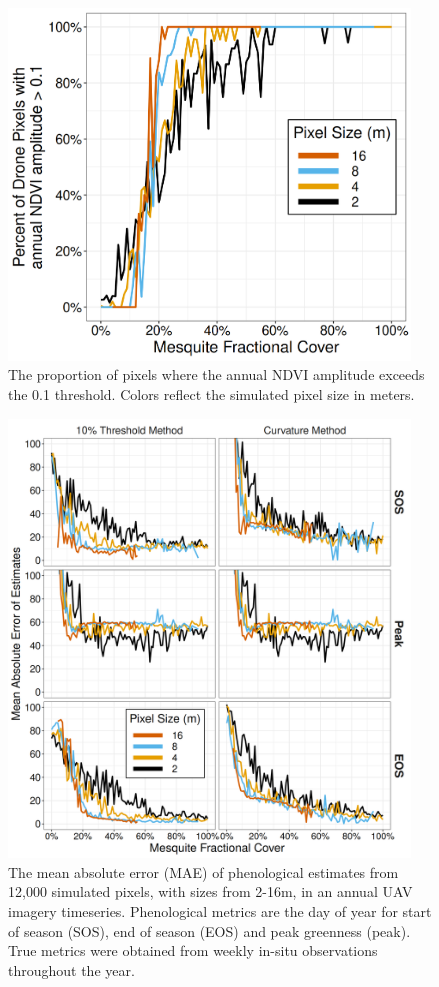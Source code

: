 \documentclass{article}
\begin{document}
\begin{figure}[h]
    \centering
    \includegraphics[width=0.95\textwidth]{figures/fig4_drone_detectability.png}
    \caption{The proportion of pixels where the annual NDVI amplitude exceeds the 0.1 threshold. Colors reflect the simulated pixel size in meters.}
    \label{fig4}
\end{figure}

\begin{figure}[h]
    \centering
    \includegraphics[width=0.95\textwidth]{figures/fig5_drone_mae.png}
    \caption{The mean absolute error (MAE) of phenological estimates from 12,000 simulated pixels, with sizes from 2-16m,  in an annual UAV imagery timeseries. Phenological metrics are the day of year for start of season (SOS), end of season (EOS) and peak greenness (peak). True metrics were obtained from weekly in-situ observations throughout the year.}
    \label{fig5}
\end{figure}
\end{document}
